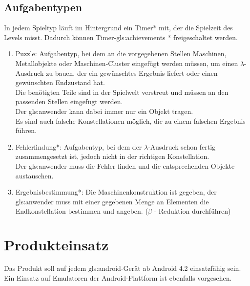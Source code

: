 \documentclass{scrartcl}
\begin{document}
\clearpage


\subsection{Aufgabentypen} \label{subsection:Aufgabentypen}

In jedem Spieltyp läuft im Hintergrund ein Timer* mit, der die Spielzeit des Levels misst. Dadurch können Timer-\glspl{gls:achievement} * freigeschaltet werden.
\begin{enumerate}
	\item \label{aufgabentyp:puzzle} Puzzle: Aufgabentyp, bei dem an die vorgegebenen Stellen Maschinen, Metallobjekte oder Maschinen-Cluster eingefügt werden müssen, um einen $\lambda$-Ausdruck zu bauen, der ein gewünschtes Ergebnis liefert oder einen gewünschten Endzustand hat.\\
	Die benötigten Teile sind in der Spielwelt verstreut und müssen an den passenden Stellen eingefügt werden.\\
	Der \gls{gls:anwender} kann dabei immer nur ein Objekt tragen.\\
	Es sind auch falsche Konstellationen möglich, die zu einem falschen Ergebnis führen.\\
	\item \label{aufgabentyp:fehlerfindung} Fehlerfindung*: Aufgabentyp, bei dem der $\lambda$-Ausdruck schon fertig zusammengesetzt ist, jedoch nicht in der richtigen Konstellation.\\
	Der \gls{gls:anwender} muss die Fehler finden und die entsprechenden Objekte austauschen.\\
	\item \label{aufgabentyp:ergebnis} Ergebnisbestimmung*: Die Maschinenkonstruktion ist gegeben, der \gls{gls:anwender} muss mit einer gegebenen Menge an Elementen die Endkonstellation bestimmen und angeben. ($\beta$ - Reduktion durchführen) 
\end{enumerate}

\clearpage









\section{Produkteinsatz}

Das Produkt soll auf jedem \gls{gls:android}-Gerät ab Android 4.2 einsatzfähig sein. Ein Einsatz auf Emulatoren der Android-Plattform ist ebenfalls vorgesehen.
\end{document}
